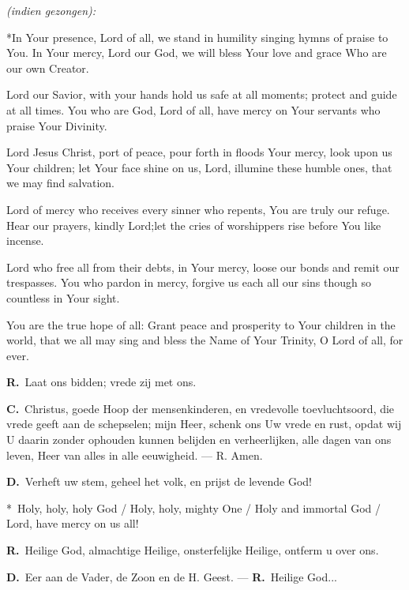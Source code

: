 \documentclass[12pt,twoside,a5paper]{article}
\newcommand{\cc}{{\color{BrickRed} \textbf{C.}}}
\newcommand{\dd}{{\color{BrickRed} \textbf{D.}}}
\newcommand{\rr}{{\color{BrickRed} \textbf{R.}}}
\newcommand{\liturgicalhint}[1]{{\color{BrickRed}\footnotesize\itshape{#1}}}
\newenvironment{doublecols}{%
  \begin{paracol}{2}%
    \setlength{\columnsep}{1.5em}%
}{%
  \end{paracol}%
}
\newenvironment{triplecols}{%
  \begin{paracol}{3}%
    \setlength{\columnsep}{1.5em}%
}{%
  \end{paracol}%
}
\newcommand{\englishl}{\switchcolumn[0]*\selectlanguage{english}}%
\newcommand{\englishc}[1]{\switchcolumn[#1]\selectlanguage{english}}%
\newcommand{\dutchc}[1]{\switchcolumn[#1]\selectlanguage{dutch}}%
\begin{document}
\begin{center}
  \liturgicalhint{(indien gezongen):}
\end{center}

\begin{triplecols}
  \englishl In Your presence, Lord of all, we stand in humility singing hymns of praise to You. In Your mercy, Lord our God, we will bless Your love and grace Who are our own Creator.

  Lord our Savior, with your hands hold us safe at all moments; protect and guide at all times. You who are God, Lord of all, have mercy on Your servants who praise Your Divinity.

  \englishc{1} Lord Jesus Christ, port of peace, pour forth in floods Your mercy, look upon us Your children; let Your face shine on us, Lord, illumine these humble ones, that we may find salvation.

  Lord of mercy who receives every sinner who repents, You are truly our refuge. Hear our prayers, kindly Lord;let the cries of worshippers rise before You like incense.

  \englishc{2} Lord who free all from their debts, in Your mercy, loose our bonds and remit our trespasses. You who pardon in mercy, forgive us each all our sins though so countless in Your sight.

  You are the true hope of all: Grant peace and prosperity to Your children in the world, that we all may sing and bless the Name of Your Trinity, O Lord of all, for ever.
\end{triplecols}

\rr\ Laat ons bidden; vrede zij met ons.

\cc\ Christus, goede Hoop der mensenkinderen, en vredevolle toevluchtsoord, die vrede geeft aan de schepselen; mijn Heer, schenk ons Uw vrede en rust, opdat wij U daarin zonder ophouden kunnen belijden en verheerlijken, alle dagen van ons leven, Heer van alles in alle eeuwigheid. --- R. Amen.

\dd\ Verheft uw stem, geheel het volk, en prijst de levende God!

\begin{doublecols}
  \englishl \rr\ Holy, holy, holy God / Holy, holy, mighty One /         Holy and immortal God / Lord, have mercy on us all!

  \dutchc{1} \rr\ Heilige God, almachtige Heilige, onsterfelijke Heilige, ontferm u over ons.
\end{doublecols}

\dd\ Eer aan de Vader, de Zoon en de H. Geest. ---  \rr\ Heilige God...
\end{document}
